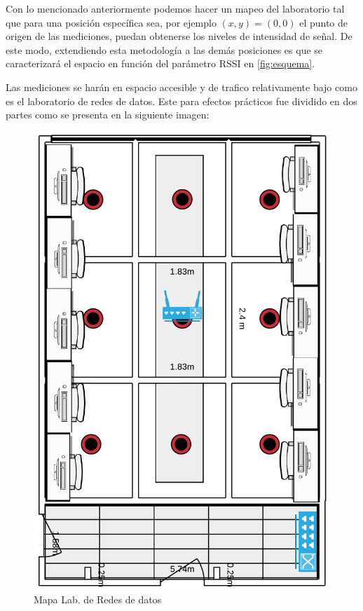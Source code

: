 Con lo mencionado anteriormente podemos hacer un mapeo del laboratorio tal que para una posición específica sea, por ejemplo $(x,y) = (0,0)$ el punto de origen de las mediciones, puedan obtenerse los niveles de intensidad de señal. De este modo, extendiendo esta metodología a las demás posiciones es que se caracterizará el espacio en función del parámetro RSSI en \ref{fig:esquema}.

Las mediciones se harán en espacio accesible y de trafico relativamente bajo como es el laboratorio de redes de datos. Este para efectos prácticos fue dividido en dos partes como se presenta en la siguiente imagen:

\begin{figure}[h!]
    \centering
    \includegraphics[angle=90,origin=c,scale=0.2]{./images/maplab}
    \caption{Mapa Lab. de Redes de datos}
    \label{fig:mapalab}
\end{figure}

